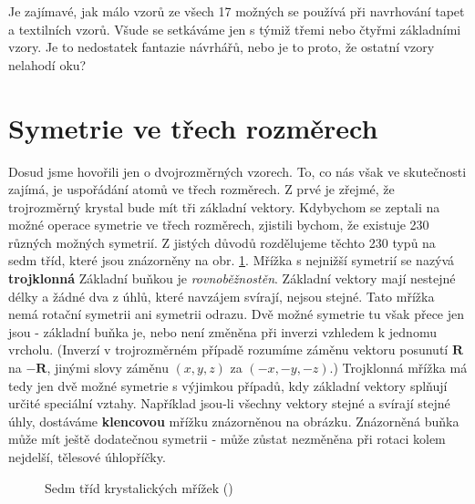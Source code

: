     Je zajímavé, jak málo vzorů ze všech \num{17} možných se používá při navrhování tapet a 
    textilních vzorů. Všude se setkáváme jen s týmiž třemi nebo čtyřmi základními vzory. Je to 
    nedostatek fantazie návrhářů, nebo je to proto, že ostatní vzory nelahodí oku?
    
  \section{Symetrie ve třech rozměrech}\label{fyz:IIchapXXXsecVI}
    Dosud jsme hovořili jen o dvojrozměrných vzorech. To, co nás však ve skutečnosti zajímá, je 
    uspořádání atomů ve třech rozměrech. Z prvé je zřejmé, že trojrozměrný krystal bude mít tři 
    základní vektory. Kdybychom se zeptali na možné operace symetrie ve třech rozměrech, zjistili 
    bychom, že existuje \num{230} různých možných symetrií. Z jistých důvodů rozdělujeme těchto 
    \num{230} typů na sedm tříd, které jsou znázorněny na obr. \ref{fyz:fig744}. Mřížka s nejnižší 
    symetrií se nazývá \textbf{trojklonná} Základní buňkou je \emph{rovnoběžnostěn}. Základní 
    vektory mají nestejné délky a žádné dva z úhlů, které navzájem svírají, nejsou stejné. Tato 
    mřížka nemá rotační symetrii ani symetrii odrazu. Dvě možné symetrie tu však přece jen jsou - 
    základní buňka je, nebo není změněna při inverzi vzhledem k jednomu vrcholu. (Inverzí v 
    trojrozměrném případě rozumíme záměnu vektoru posunutí \(\bm{R}\) na \(\bm{-R}\), jinými slovy 
    záměnu \((x, y, z)\) za \((-x, -y, -z)\).) Trojklonná mřížka má tedy jen dvě možné symetrie s 
    výjimkou případů, kdy základní vektory splňují určité speciální vztahy. Například jsou-li 
    všechny vektory stejné a svírají stejné úhly, dostáváme \textbf{klencovou} mřížku znázorněnou 
    na obrázku. Znázorněná buňka může mít ještě dodatečnou symetrii - může zůstat nezměněna při 
    rotaci kolem nejdelší, tělesové úhlopříčky.
    

    \begin{figure}[ht!]   %
      \centering
                    \newline
                    \newline
                    \newline
      \caption{Sedm tříd krystalických mřížek (\cite[s.~552]{Feynman02})}
      \label{fyz:fig744}
    \end{figure}
    
